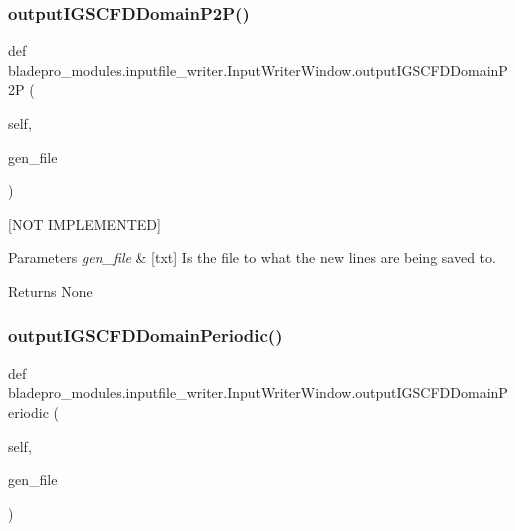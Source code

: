 \subsubsection{\texorpdfstring{output\+I\+G\+S\+C\+F\+D\+Domain\+P2\+P()}{outputIGSCFDDomainP2P()}}
{\footnotesize\ttfamily def bladepro\+\_\+modules.\+inputfile\+\_\+writer.\+Input\+Writer\+Window.\+output\+I\+G\+S\+C\+F\+D\+Domain\+P2P (\begin{DoxyParamCaption}\item[{}]{self,  }\item[{}]{gen\+\_\+file }\end{DoxyParamCaption})}



\mbox{[}N\+OT I\+M\+P\+L\+E\+M\+E\+N\+T\+ED\mbox{]} 


\begin{DoxyParams}{Parameters}
{\em gen\+\_\+file} & \mbox{[}txt\mbox{]} Is the file to what the new lines are being saved to. \\
\hline
\end{DoxyParams}
\begin{DoxyReturn}{Returns}
None 
\end{DoxyReturn}
\hypertarget{classbladepro__modules_1_1inputfile__writer_1_1_input_writer_window_a3093ea91273711f4b82aa878c0204407}{}\label{classbladepro__modules_1_1inputfile__writer_1_1_input_writer_window_a3093ea91273711f4b82aa878c0204407} 
\subsubsection{\texorpdfstring{output\+I\+G\+S\+C\+F\+D\+Domain\+Periodic()}{outputIGSCFDDomainPeriodic()}}
{\footnotesize\ttfamily def bladepro\+\_\+modules.\+inputfile\+\_\+writer.\+Input\+Writer\+Window.\+output\+I\+G\+S\+C\+F\+D\+Domain\+Periodic (\begin{DoxyParamCaption}\item[{}]{self,  }\item[{}]{gen\+\_\+file }\end{DoxyParamCaption})}



